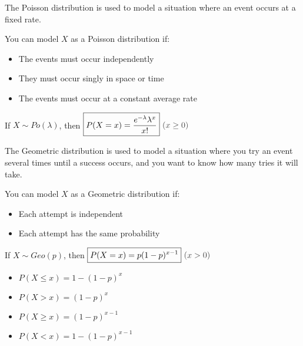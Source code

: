 \documentclass[../main.tex]{subfile}
\begin{document}


The Poisson distribution is used to model a situation where an event occurs at a fixed rate.

You can model $X$ as a Poisson distribution if:
\begin{itemize}
	\item The events must occur independently
	\item They must occur singly in space or time
	\item The events must occur at a constant average rate
\end{itemize}

\begin{center}
	If $X \sim Po(\lambda)$, then $\boxed{P(X = x) = \frac{e^{-\lambda} \lambda^x}{x!}}\ \constraint{x \geq 0}$
\end{center}


The Geometric distribution is used to model a situation where you try an event several times until a success occurs, and you want to know how many tries it will take.

You can model $X$ as a Geometric distribution if:
\begin{itemize}
	\item Each attempt is independent
	\item Each attempt has the same probability
\end{itemize}

\begin{center}
	If $X \sim Geo(p)$, then $\boxed{P(X = x) = p(1 - p)^{x - 1}}\ \constraint{x > 0}$

\end{center}

\begin{itemize}
	\item $\boxed{P(X \leq x) = 1 - (1 - p)^x}$
	\item $P(X > x) = (1 - p)^x$
	\item $\boxed{P(X \geq x) = (1 - p)^{x - 1}}$
	\item $P(X < x) = 1 - (1 - p)^{x - 1}$
\end{itemize}
\end{document}
